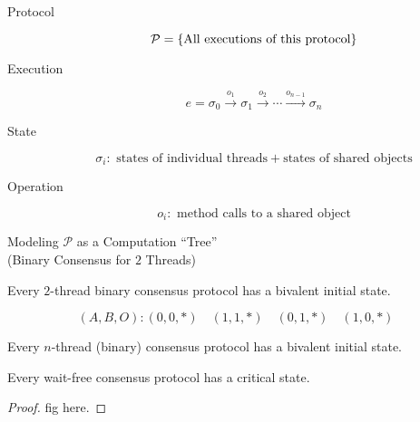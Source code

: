 \begin{frame}{}
  \centerline{\Large {}}

  \vspace{0.60cm}
  \begin{description}
    \item[Protocol] 
      \[
	\mathcal{P} = \{\text{All executions of this protocol}\}
      \]
    \item[Execution] 
      \[
	e = \sigma_0 \xrightarrow{o_1} \sigma_1 \xrightarrow{o_2} \cdots \xrightarrow{o_{n-1}} \sigma_{n}
      \]
    \item[State] 
      \[
	\sigma_i: \text{ states of individual threads} + \text{states of shared objects}
      \]
    \item[Operation] 
      \[
	o_i: \text{ method calls to a shared object}
      \]
  \end{description}
\end{frame}

\begin{frame}{}
  \begin{center}
    Modeling $\mathcal{P}$ as a Computation ``Tree'' \\[2pt]
    {\small (Binary Consensus for $2$ Threads)}
  \end{center}
  
\end{frame}

\begin{frame}{}
  \begin{theorem}
    Every $2$-thread binary consensus protocol has a bivalent initial state.
  \end{theorem}

  \pause
  \[
    (A, B, O): (0,0,\ast) \quad (1,1,\ast) \quad (0,1,\ast) \quad (1,0,\ast)
  \]

  \pause
\end{frame}

\begin{frame}{}
  \begin{lemma}
    Every $n$-thread (binary) consensus protocol has a bivalent initial state.
  \end{lemma}

  \pause
  \vspace{0.30cm}
  \begin{theorem}
    Every wait-free consensus protocol has a critical state.
  \end{theorem}

  \pause
  \vspace{0.30cm}
  \begin{proof}
    fig here.
  \end{proof}
\end{frame}

